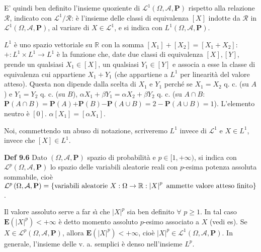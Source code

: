 \documentclass{article}
\begin{document}
E' quindi ben definito l'insieme quoziente di $\mathcal{L}^{1}\left( \Omega ,%
\mathcal{A},\mathbf{P}\right) $ rispetto alla relazione $\mathcal{R}$,
indicato con $\mathcal{L}^{1}/\mathcal{R}$: \`{e} l'insieme delle classi di
equivalenza $\left[ X\right] $ indotte da $\mathcal{R}$ in $\mathcal{L}%
^{1}\left( \Omega ,\mathcal{A},\mathbf{P}\right) $, al variare di $X\in 
\mathcal{L}^{1}$, e si indica con $L^{1}\left( \Omega ,\mathcal{A},\mathbf{P}%
\right) $.

$L^{1}$ \`{e} uno spazio vettoriale su $%
\mathbb{R}
$ con la somma $\left[ X_{1}\right] +\left[ X_{2}\right] =\left[ X_{1}+X_{2}%
\right] $: $+:L^{1}\times L^{1}\rightarrow L^{1}$ \`{e} la funzione che,
date due classi di equivalenza $\left[ X\right] ,\left[ Y\right] $, prende
un qualsiasi $X_{1}\in \left[ X\right] $, un qualsiasi $Y_{1}\in \left[ Y%
\right] $ e associa a esse la classe di equivalenza cui appartiene $%
X_{1}+Y_{1}$ (che appartiene a $L^{1}$ per linearit\`{a} del valore atteso).
Questa non dipende dalla scelta di $X_{1}$ e $Y_{1}$ perch\'{e} se $%
X_{1}=X_{2}$ q. c. (su $A$) e $Y_{1}=Y_{2}$ q. c. (su $B$), $\alpha
X_{1}+\beta Y_{1}=\alpha X_{2}+\beta Y_{2}$ q. c. (su $A\cap B$: $\mathbf{P}%
\left( A\cap B\right) =\mathbf{P}\left( A\right) \mathbf{+P}\left( B\right) 
\mathbf{-P}\left( A\cup B\right) =2-\mathbf{P}\left( A\cup B\right) =1$).
L'elemento neutro \`{e} $\left[ 0\right] $. $\alpha \left[ X_{1}\right] =%
\left[ \alpha X_{1}\right] $.

Noi, commettendo un abuso di notazione, scriveremo $L^{1}$ invece di $%
\mathcal{L}^{1}$ e $X\in L^{1}$, invece che $\left[ X\right] \in L^{1}$.

\textbf{Def 9.6} Dato $\left( \Omega ,\mathcal{A},\mathbf{P}\right) $ spazio
di probabilit\`{a} e $p\in \lbrack 1,+\infty )$, si indica con $\mathcal{L}%
^{p}\left( \Omega ,\mathcal{A},\mathbf{P}\right) $ lo spazio delle variabili
aleatorie reali con $p$-esima potenza assoluta sommabile, cio\`{e} $\mathcal{%
L}^{p}\left( \Omega ,\mathcal{A},\mathbf{P}\right) =\left\{ \text{variabili
aleatorie }X:\Omega \rightarrow 
\mathbb{R}
:\left\vert X\right\vert ^{p}\text{ ammette valore atteso finito}\right\} $.

Il valore assoluto serve a far s\`{\i} che $\left\vert X\right\vert ^{p}$
sia ben definito $\forall $ $p\geq 1$. In tal caso $\mathbf{E}\left(
\left\vert X\right\vert ^{p}\right) <+\infty $ \`{e} detto momento assoluto $%
p$-esimo associato a $X$ (vedi es). Se $X\in \mathcal{L}^{p}\left( \Omega ,%
\mathcal{A},\mathbf{P}\right) $, allora $\mathbf{E}\left( \left\vert
X\right\vert ^{p}\right) <+\infty $, cio\`{e} $\left\vert X\right\vert
^{p}\in \mathcal{L}^{1}\left( \Omega ,\mathcal{A},\mathbf{P}\right) $. In
generale, l'insieme delle v. a. semplici \`{e} denso nell'insieme $L^{p}$.
\end{document}
